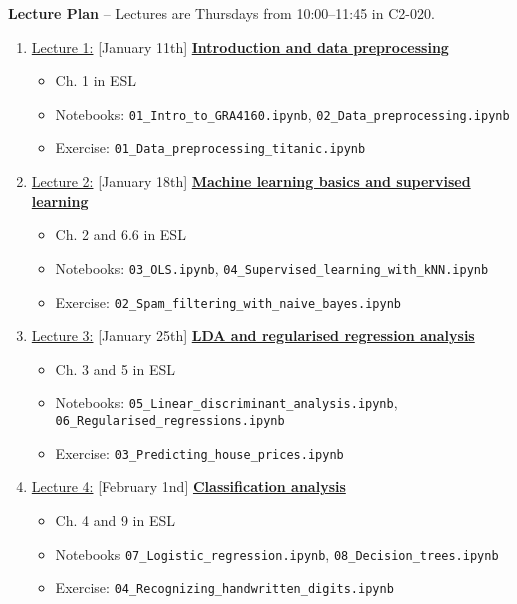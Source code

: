 \documentclass[12pt, a4paper]{article}
\begin{document}
\newpage
\noindent\textbf{\large Lecture Plan}
-- Lectures are Thursdays from 10:00--11:45 in C2-020. \\
\begin{enumerate}
  \item[] \underline{Lecture 1:} [January 11th] \underline{\bf Introduction and data preprocessing}
    {\small
      \begin{itemize}
        \item Ch. 1 in ESL
        \item Notebooks: \texttt{01\_Intro\_to\_GRA4160.ipynb}, \texttt{02\_Data\_preprocessing.ipynb}
        \item Exercise: \texttt{01\_Data\_preprocessing\_titanic.ipynb}
      \end{itemize}
    }
  \item[] \underline{Lecture 2:} [January 18th] \underline{\bf Machine learning basics and supervised learning}
    {\small
      \begin{itemize}
        \item Ch. 2 and 6.6 in ESL
        \item Notebooks: \texttt{03\_OLS.ipynb}, \texttt{04\_Supervised\_learning\_with\_kNN.ipynb}
        \item Exercise: \texttt{02\_Spam\_filtering\_with\_naive\_bayes.ipynb}
      \end{itemize}
    }
  \item[] \underline{Lecture 3:} [January 25th] \underline{\bf LDA and regularised regression analysis}
    {\small
      \begin{itemize}
        \item Ch. 3 and 5 in ESL
        \item Notebooks: \texttt{05\_Linear\_discriminant\_analysis.ipynb}, \texttt{06\_Regularised\_regressions.ipynb}
        \item Exercise: \texttt{03\_Predicting\_house\_prices.ipynb}
      \end{itemize}
    }
  \item [] \underline{Lecture 4:} [February 1nd] \underline{\bf Classification analysis}
        {\small
          \begin{itemize}
            \item Ch. 4 and 9 in ESL
            \item Notebooks \texttt{07\_Logistic\_regression.ipynb}, \texttt{08\_Decision\_trees.ipynb}
            \item Exercise: \texttt{04\_Recognizing\_handwritten\_digits.ipynb}

\end{itemize}}
\end{enumerate}
\end{document}
